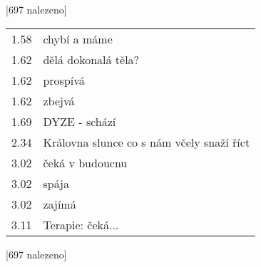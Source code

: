 \begin{table}[H]
\begin{tt}

\horizlina

\noindent
\begin{minipage}[t]{.5\textwidth}\vspace{0pt}
 [697 nalezeno]\vspace{5pt}

\begin{tabulary}{1.1\textwidth}{LL}
1.58 &   chybí a  máme \\
1.62 &   dělá dokonalá těla? \\
1.62 &   prospívá \\
1.62 &   zbejvá \\
1.69 & DYZE -   schází \\
2.34 & Královna slunce  co s nám včely snaží říct \\
3.02 &   čeká v budoucnu \\
3.02 &   spája \\
3.02 &   zajímá \\
3.11 & Terapie:   čeká... \\
\end{tabulary}
\end{minipage}
\begin{minipage}[t]{.5\textwidth}\vspace{0pt}
 [697 nalezeno]\vspace{5pt}


\end{minipage}
\end{tt}
\end{table}
